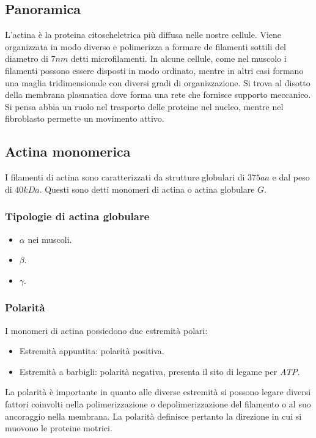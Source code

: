 	\subsection{Panoramica}
	L'actina \`e la proteina citoscheletrica pi\`u diffusa nelle nostre cellule.
	Viene organizzata in modo diverso e polimerizza a formare de filamenti sottili del diametro di $7nm$ detti microfilamenti.
	In alcune cellule, come nel muscolo i filamenti possono essere disposti in modo ordinato, mentre in altri casi formano una maglia tridimensionale con diversi gradi di organizzazione.
	Si trova al disotto della membrana plasmatica dove forma una rete che fornisce supporto meccanico.
	Si pensa abbia un ruolo nel trasporto delle proteine nel nucleo, mentre nel fibroblasto permette un movimento attivo.

	\subsection{Actina monomerica}
	I filamenti di actina sono caratterizzati da strutture globulari di $375aa$ e dal peso di $40kDa$.
	Questi sono detti monomeri di actina o actina globulare $G$.

		\subsubsection{Tipologie di actina globulare}
		\begin{multicols}{3}
			\begin{itemize}
				\item $\alpha$ nei muscoli.
				\item $\beta$.
				\item $\gamma$.
			\end{itemize}
		\end{multicols}

		\subsubsection{Polarit\`a}
		I monomeri di actina possiedono due estremit\`a polari:
		\begin{multicols}{2}
			\begin{itemize}
				\item Estremit\`a appuntita: polarit\`a positiva.
				\item Estremit\`a a barbigli: polarit\`a negativa, presenta il sito di legame per \emph{ATP}.
			\end{itemize}
		\end{multicols}
		La polarit\`a \`e importante in quanto alle diverse estremit\`a si possono legare diversi fattori coinvolti nella polimerizzazione o depolimerizzazione del filamento o al suo ancoraggio nella membrana.
		La polarit\`a definisce pertanto la direzione in cui si muovono le proteine motrici.

